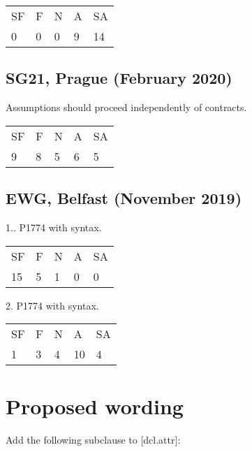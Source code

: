\hspace{6mm}
\begin{tabular}{lllll}
SF & F & N & A & SA \\
0 & 0 & 0 & 9 & 14
\end{tabular}

\subsection{SG21, Prague (February 2020)}

Assumptions should proceed independently of contracts.

\hspace{6mm}
\begin{tabular}{lllll}
SF & F & N & A & SA \\
9 & 8 & 5 & 6 & 5
\end{tabular}


\subsection{EWG, Belfast (November 2019)}

1.. P1774 with  syntax.

\hspace{6mm}
\begin{tabular}{lllll}
SF & F & N & A & SA \\
15 & 5 & 1 & 0 & 0
\end{tabular}

2. P1774 with  syntax.

\hspace{6mm}
\begin{tabular}{lllll}
SF & F & N & A & SA \\
1 & 3 & 4 & 10 & 4
\end{tabular}

\section{Proposed wording}

Add the following subclause to [dcl.attr]:

